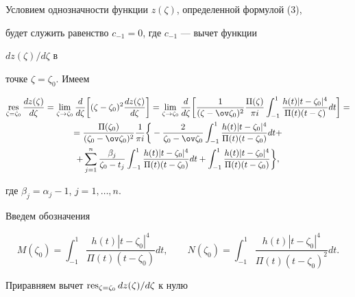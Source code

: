  


Условием однозначности функции $z(\zeta)$, определенной формулой (3), 


будет служить равенство $c_{-1}=0$, где $c_{-1}$ --- вычет функции 


$dz(\zeta)/d\zeta$ в 


точке $\zeta=\zeta_0$. Имеем 


\begin{multline*} 


\Res_{\zeta=\zeta_0}\frac{dz(\zeta)}{d\zeta}=\lim_{\zeta\to\zeta_0} 


\frac{d}{d\zeta}\bigg[(\zeta-\zeta_0)^2\frac{dz(\zeta)}{d\zeta}\bigg] 


=\lim_{\zeta\to\zeta_0}\frac{d}{d\zeta}\bigg[\frac{1} 


{(\zeta-\ov\zeta_0)^2}\frac{\Pi(\zeta)}{\pi i} 


\int^1_{-1}\frac{h(t)|t-\zeta_0|^4}{\Pi(t)(t-\zeta)}dt\bigg]= \\ 


% 


=\frac{\Pi(\zeta_0)}{(\zeta_0-\ov\zeta_0)^2}\frac{1}{\pi i}\bigg\{ 


-\frac{2}{\zeta_0-\ov\zeta_0} 


\int^1_{-1}\frac{h(t)|t-\zeta_0|^4}{\Pi(t)(t-\zeta_0)}dt+ \\ 


% 


+\sum^n_{j=1}\frac{\beta_j}{\zeta_0-t_j} 


\int^1_{-1}\frac{h(t)|t-\zeta_0|^4}{\Pi(t)(t-\zeta_0)}dt+ 


\int^1_{-1}\frac{h(t)|t-\zeta_0|^4}{\Pi(t)(t-\zeta_0)}\bigg\}, 


\end{multline*} 


где $\beta_j=\alpha_j-1$, $j=1,\dotsc,n$. 


 


Введем обозначения 


$$ 


M(\zeta_0)= 


\int^1_{-1}\frac{h(t)|t-\zeta_0|^4}{\Pi(t)(t-\zeta_0)}dt,\qquad 


N(\zeta_0)= 


\int^1_{-1}\frac{h(t)|t-\zeta_0|^4}{\Pi(t)(t-\zeta_0)^2}dt. 


$$ 


Приравняем вычет $\Res_{\zeta=\zeta_0}dz(\zeta)/d\zeta$ к нулю 


